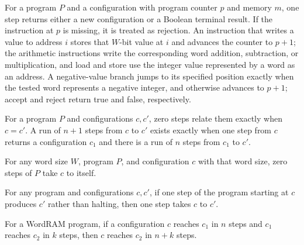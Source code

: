 \begin{definition}
\label{WordRAM.step}
\leanok
{}
For a program $P$ and a configuration with program counter $p$ and memory $m$, one step
returns either a new configuration or a Boolean terminal result. If the instruction at
$p$ is missing, it is treated as rejection. An instruction that writes a value to
address $i$ stores that $W$-bit value at $i$ and advances the counter to $p+1$; the
arithmetic instructions write the corresponding word addition, subtraction, or
multiplication, and load and store use the integer value represented by a word as an
address. A negative-value branch jumps to its specified position exactly when the tested
word represents a negative integer, and otherwise advances to $p+1$; accept and reject
return true and false, respectively.
\end{definition}

\begin{definition}
\label{WordRAM.Steps}
\leanok
{}
For a program $P$ and configurations $c,c'$, zero steps relate them exactly when $c=c'$.
A run of $n+1$ steps from $c$ to $c'$ exists exactly when one step from $c$ returns a
configuration $c_1$ and there is a run of $n$ steps from $c_1$ to $c'$.
\end{definition}

\begin{theorem}
\label{WordRAM.Steps.refl}
\leanok
{}
For any word size $W$, program $P$, and configuration $c$ with that word size, zero
steps of $P$ take $c$ to itself.
\end{theorem}

\begin{theorem}
\label{WordRAM.Steps.one}
\leanok
{}
For any program and configurations $c,c'$, if one step of the program starting at $c$
produces $c'$ rather than halting, then one step takes $c$ to $c'$.
\end{theorem}

\begin{theorem}
\label{WordRAM.Steps.trans}
\leanok
{}
For a WordRAM program, if a configuration $c$ reaches $c_1$ in $n$ steps and $c_1$
reaches $c_2$ in $k$ steps, then $c$ reaches $c_2$ in $n+k$ steps.
\end{theorem}

